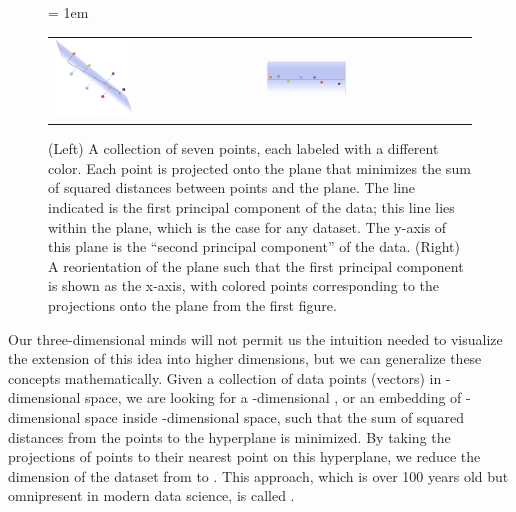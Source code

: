 \begin{figure}[h]
\centering
\mySfFamily
\tabcolsep = 1em
\begin{tabular}{m{} m{}}
\includegraphics[width = 0.4\textwidth]{../images/three_dimensional_pca.png} &
\includegraphics[width = 0.4\textwidth]{../images/three_dimensional_pca_plane.png}
\end{tabular}
\caption{(Left) A collection of seven points, each labeled with a different color. Each point is projected onto the plane that minimizes the sum of squared distances between points and the plane. The line indicated is the first principal component of the data; this line lies within the plane, which is the case for any dataset. The y-axis of this plane is the ``second principal component'' of the data. (Right) A reorientation of the plane such that the first principal component is shown as the x-axis, with colored points corresponding to the projections onto the plane from the first figure.}
\label{fig:three_dimensional_pca}
\end{figure}

Our three-dimensional minds will not permit us the intuition needed to visualize the extension of this idea into higher dimensions, but we can generalize these concepts mathematically. Given a collection of  data points (vectors) in -dimensional space, we are looking for a -dimensional , or an embedding of -dimensional space inside -dimensional space, such that the sum of squared distances from the points to the hyperplane is minimized. By taking the projections of points to their nearest point on this hyperplane, we reduce the dimension of the dataset from  to . This approach, which is over 100 years old but omnipresent in modern data science, is called .\\

